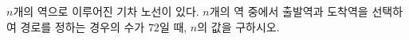 \hspace*{2mm}\begin{minipage}[t]{\dimexpr\linewidth-2mm\relax}\vspace{0pt}
$n$개의 역으로 이루어진 기차 노선이 있다. $n$개의 역 중에서 출발역과 도착역을 선택하여 경로를 정하는 경우의 수가 $72$일 때, $n$의 값을 구하시오.\end{minipage}
